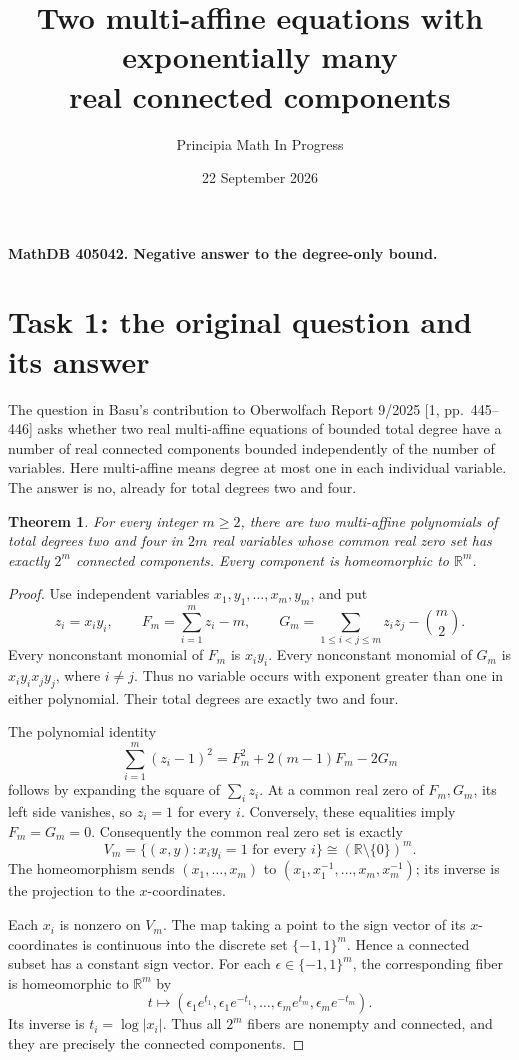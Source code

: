 \documentclass[11pt]{article}
\title{Two multi-affine equations with exponentially many\\real connected components}
\author{Principia Math In Progress}
\date{22 September 2026}
\newtheorem{theorem}{Theorem}
\newcommand{\R}{\mathbb R}
\begin{document}
\maketitle
\noindent\textbf{MathDB 405042. Negative answer to the degree-only bound.}

\section*{Task 1: the original question and its answer}
The question in Basu's contribution to Oberwolfach Report 9/2025
[1, pp.~445--446] asks whether two real multi-affine equations of
bounded total degree have a number of real connected components
bounded independently of the number of variables.
Here multi-affine means degree at most one in each individual variable.
The answer is no, already for total degrees two and four.

\begin{theorem}
For every integer \(m\geq2\), there are two multi-affine polynomials
of total degrees two and four in \(2m\) real variables whose common
real zero set has exactly \(2^m\) connected components.
Every component is homeomorphic to \(\R^m\).
\end{theorem}

\begin{proof}
Use independent variables \(x_1,y_1,\ldots,x_m,y_m\), and put
\[
 z_i=x_i y_i,\qquad
 F_m=\sum_{i=1}^m z_i-m,\qquad
 G_m=\sum_{1\leq i<j\leq m}z_i z_j-\binom m2.                 \tag{1}
\]
Every nonconstant monomial of \(F_m\) is \(x_i y_i\).
Every nonconstant monomial of \(G_m\) is
\(x_i y_i x_j y_j\), where \(i\ne j\).
Thus no variable occurs with exponent greater than one in either
polynomial. Their total degrees are exactly two and four.

The polynomial identity
\[
 \sum_{i=1}^m(z_i-1)^2
       =F_m^2+2(m-1)F_m-2G_m                              \tag{2}
\]
follows by expanding the square of \(\sum_i z_i\).
At a common real zero of \(F_m,G_m\), its left side vanishes,
so \(z_i=1\) for every \(i\). Conversely, these equalities imply
\(F_m=G_m=0\). Consequently the common real zero set is exactly
\[
 V_m=\{(x,y):x_i y_i=1\text{ for every }i\}
       \cong(\R\setminus\{0\})^m.                         \tag{3}
\]
The homeomorphism sends \((x_1,\ldots,x_m)\) to
\((x_1,x_1^{-1},\ldots,x_m,x_m^{-1})\); its inverse is the
projection to the \(x\)-coordinates.

Each \(x_i\) is nonzero on \(V_m\). The map taking a point to the
sign vector of its \(x\)-coordinates is continuous into the discrete
set \(\{-1,1\}^m\). Hence a connected subset has a constant sign vector.
For each \(\epsilon\in\{-1,1\}^m\), the corresponding fiber is
homeomorphic to \(\R^m\) by
\[
 t\longmapsto
  (\epsilon_1e^{t_1},\epsilon_1e^{-t_1},
        \ldots,\epsilon_me^{t_m},\epsilon_me^{-t_m}).       \tag{4}
\]
Its inverse is \(t_i=\log|x_i|\). Thus all \(2^m\) fibers are nonempty
and connected, and they are precisely the connected components.
\end{proof}
\end{document}
